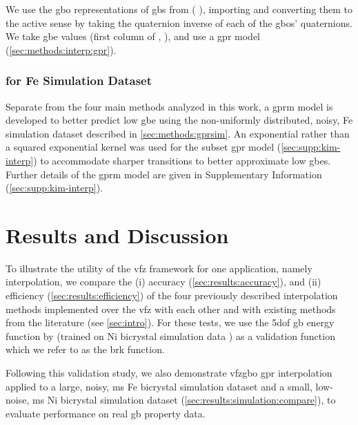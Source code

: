 \documentclass[final,twocolumn,12pt]{elsarticle}
\begin{document}
We use the \gls{gbo} representations \cite{chesserLearningGrainBoundary2020} of \glspl{gb} from \cite{olmstedSurveyComputedGrain2009} ( \cite{chesserGBOctonionCode2019}), importing and converting them to the active sense by taking the quaternion inverse of each of the \glspl{gbo}' quaternions. We take \gls{gbe} values (first column of , \cite{chesserGBOctonionCode2019}), and use a \gls{gpr} model (\cref{sec:methods:interp:gpr}).

\subsubsection{ for Fe Simulation Dataset}
\label{sec:methods:gprmix}
Separate from the four main methods analyzed in this work, a \gls{gprm} model is developed to better predict low \gls{gbe} using the non-uniformly distributed, noisy, Fe simulation dataset described in \cref{sec:methods:gprsim}. An exponential rather than a squared exponential kernel was used for the subset \gls{gpr} model (\cref{sec:supp:kim-interp}) to accommodate sharper transitions to better approximate low \glspl{gbe}.  Further details of the \gls{gprm} model are given in Supplementary Information (\cref{sec:supp:kim-interp}).

\section{Results and Discussion} \label{sec:results}

To illustrate the utility of the \gls{vfz} framework for one application, namely interpolation, we compare the (i) accuracy (\cref{sec:results:accuracy}), and (ii) efficiency (\cref{sec:results:efficiency}) of the four previously described interpolation methods implemented over the \gls{vfz} with each other and with existing methods from the literature (see \cref{sec:intro}). For these tests, we use the \gls{5dof} \gls{gb} energy function by \citet{bulatovGrainBoundaryEnergy2014} (trained on Ni bicrystal simulation data \cite{olmstedSurveyComputedGrain2009}) as a validation function which we refer to as the \gls{brk} function. 

Following this validation study, we also demonstrate \gls{vfzgbo} \gls{gpr} interpolation applied to a large, noisy, \gls{ms} Fe bicrystal simulation dataset \cite{kimPhasefieldModeling3D2014} and a small, low-noise, \gls{ms} Ni bicrystal simulation dataset \cite{olmstedSurveyComputedGrain2009} (\cref{sec:results:simulation:compare}), to evaluate performance on real \gls{gb} property data.
\end{document}
